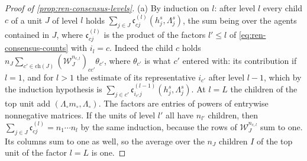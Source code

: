 \begin{proof}[Proof of \cref{prop:ren-consensus-levels}]
(a) By induction on $l$: after level $l$ every child $c$ of a unit $J$ of level $l$ holds $\sum_{j\in J}\mathfrak c^{(l)}_{cj}(h^s_j,\Lambda^s_j)$, the sum being over the agents contained in $J$, where $\mathfrak c^{(l)}_{cj}$ is the product of the factors $l'\le l$ of \eqref{eq:ren-consensus-counts} with $i_l=c$. Indeed the child $c$ holds $n_J\sum_{c'\in\mathrm{ch}(J)}(\mathcal W_J^{n_{\mathrm c,l}})_{cc'}\theta_{c'}$, where $\theta_{c'}$ is what $c'$ entered with: its contribution if $l=1$, and for $l>1$ the estimate of its representative $i_{c'}$ after level $l-1$, which by the induction hypothesis is $\sum_{j\in c'}\mathfrak c^{(l-1)}_{i_{c'}j}(h^s_j,\Lambda^s_j)$. At $l=L$ the children of the top unit add $(\Lambda_\circ m_\circ,\Lambda_\circ)$. The factors are entries of powers of entrywise nonnegative matrices. If the units of level $l'$ all have $n_{l'}$ children, then $\sum_{j\in J}\mathfrak c^{(l)}_{cj}=n_1\cdots n_l$ by the same induction, because the rows of $\mathcal W_J^{n_{\mathrm c,l}}$ sum to one. Its columns sum to one as well, so the average over the $n_J$ children $I$ of the top unit of the factor $l=L$ is one.


\end{proof}
